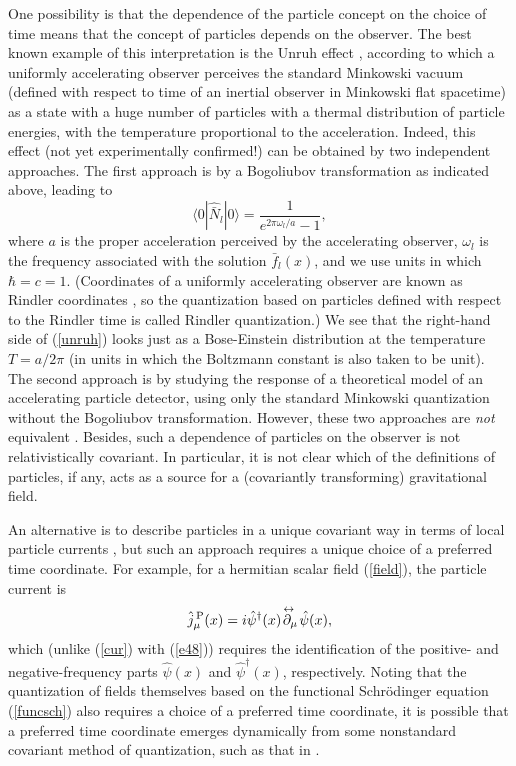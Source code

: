 \documentclass[12pt]{article}
\begin{document}
One possibility is that the dependence of the particle concept 
on the choice of time means that the concept of particles 
depends on the observer. The best known example of this interpretation 
is the Unruh effect \cite{unruh,unruh2,birdav}, according to which 
a uniformly accelerating observer perceives the standard Minkowski vacuum
(defined with respect to time of an inertial observer in Minkowski flat 
spacetime) as a state with a huge number of particles with a thermal 
distribution of particle energies, with the temperature proportional 
to the acceleration. Indeed, this effect (not yet experimentally confirmed!)
can be obtained by two independent 
approaches. The first approach is by a Bogoliubov transformation as indicated
above, leading to \cite{unruh,birdav}
\begin{equation}\label{unruh}
\langle 0|\hat{\bar{N}}_l|0\rangle=\frac{1}{e^{2\pi\omega_l/a}-1},
\end{equation}
where $a$ is the proper acceleration perceived by the 
accelerating observer, $\omega_l$ is the frequency associated with 
the solution $\bar{f}_l(x)$, 
and we use units in which $\hbar=c=1$.
(Coordinates of a uniformly accelerating observer are known
as Rindler coordinates \cite{rind}, so the
quantization based on particles defined with respect 
to the Rindler time is called 
Rindler quantization.) We see that the right-hand side of (\ref{unruh}) looks 
just as a Bose-Einstein distribution at the temperature $T=a/2\pi$
(in units in which the Boltzmann constant is also taken to be unit).
The second approach is by studying the response of 
a theoretical model of an accelerating particle detector, 
using only the standard 
Minkowski quantization without the Bogoliubov transformation. 
However, these two approaches are {\em not}
equivalent \cite{padmun,nikolun}. Besides, such a dependence of particles 
on the observer is not relativistically covariant. In particular, it is not 
clear which of the definitions of particles, if any, acts as a source 
for a (covariantly transforming) gravitational field. 

An alternative 
is to describe particles in a unique covariant way in terms of local 
particle currents \cite{nikolcur}, but such an approach requires a 
unique choice of a preferred time coordinate. For example, for a hermitian 
scalar field (\ref{field}), the particle current is
\begin{equation}\label{enik1}
\hat{j}^{\,\rm P}_{\mu}(x)=i\hat{\psi}^{\dagger}(x) 
\!\stackrel{\leftrightarrow\;}{\partial_{\mu}}\! \hat{\psi}(x) ,
\end{equation}
which (unlike (\ref{cur}) with (\ref{e48})) requires the identification of 
the positive- and negative-frequency parts 
$\hat{\psi}(x)$ and $\hat{\psi}^{\dagger}(x)$, respectively. 
Noting that the quantization of fields 
themselves based on the functional Schr\"odinger equation 
(\ref{funcsch}) also requires a choice of a preferred time coordinate, 
it is possible that a preferred time coordinate emerges dynamically 
from some nonstandard covariant method of quantization, such as that in
\cite{nikddw}.
\end{document}
